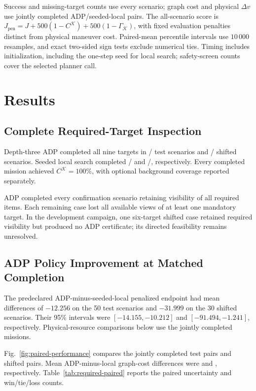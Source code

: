 Success and missing-target counts use every scenario; graph cost and physical $\Delta v$ use jointly completed ADP/seeded-local pairs. The all-scenario score is $J_{\mathrm{pen}}=J+500(1-C^{\mathcal K})+500(1-\Gamma_{\mathcal K})$, with fixed evaluation penalties distinct from physical maneuver cost. Paired-mean percentile intervals use $10\,000$ resamples, and exact two-sided sign tests exclude numerical ties. Timing includes initialization, including the one-step seed for local search; safety-screen counts cover the selected planner call.

\section{Results}
\label{sec:results}

\subsection{Complete Required-Target Inspection}

Depth-three ADP completed all nine targets in \RTTestSuccess/\RTTestN{} test scenarios and \RTOodSuccess/\RTOodN{} shifted scenarios. Seeded local search completed \RTLocalTestSuccess/\RTTestN{} and \RTLocalOodSuccess/\RTOodN{}, respectively. Every completed mission achieved $C^{\mathcal K}=100\%$, with optional background coverage reported separately.




ADP completed every confirmation scenario retaining visibility of all required items. Each remaining case lost all available views of at least one mandatory target. In the development campaign, one six-target shifted case retained required visibility but produced no ADP certificate; its directed feasibility remains unresolved.

\subsection{ADP Policy Improvement at Matched Completion}

The predeclared ADP-minus-seeded-local penalized endpoint had mean differences of $-12.256$ on the 50 test scenarios and $-31.999$ on the 30 shifted scenarios. Their 95\% intervals were $[-14.155,-10.212]$ and $[-91.494,-1.241]$, respectively. Physical-resource comparisons below use the jointly completed missions.

Fig.~\ref{fig:paired-performance} compares the \RTJointTestN{} jointly completed test pairs and \RTJointOodN{} shifted pairs. Mean ADP-minus-local graph-cost differences were \RTTestCostDiff{} and \RTOodCostDiff{}, respectively. Table~\ref{tab:required-paired} reports the paired uncertainty and win/tie/loss counts.

